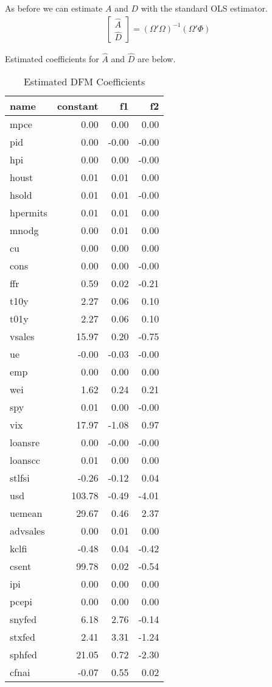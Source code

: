\documentclass[11pt, letterpaper]{article}\usepackage[]{graphicx}\usepackage[]{color}
\begin{document}
As before we can estimate $A$ and $D$ with the standard OLS estimator.
\begin{align*}
\begin{bmatrix}
	\widehat{A}\\
	\widehat{D}
\end{bmatrix} =
(\Omega' \Omega)^{-1} (\Omega'\Phi)
\end{align*}

Estimated coefficients for $\widehat{A}$ and $\widehat{D}$ are below.
\begin{table}[H]
\centering
\begingroup\footnotesize
\begin{tabular}{lrrr}
  \hline
name & constant & f1 & f2 \\ 
  \hline
mpce & 0.00 & 0.00 & 0.00 \\ 
  pid & 0.00 & -0.00 & -0.00 \\ 
  hpi & 0.00 & 0.00 & -0.00 \\ 
  houst & 0.01 & 0.01 & 0.00 \\ 
  hsold & 0.01 & 0.01 & -0.00 \\ 
  hpermits & 0.01 & 0.01 & 0.00 \\ 
  mnodg & 0.00 & 0.01 & 0.00 \\ 
  cu & 0.00 & 0.00 & 0.00 \\ 
  cons & 0.00 & 0.00 & -0.00 \\ 
  ffr & 0.59 & 0.02 & -0.21 \\ 
  t10y & 2.27 & 0.06 & 0.10 \\ 
  t01y & 2.27 & 0.06 & 0.10 \\ 
  vsales & 15.97 & 0.20 & -0.75 \\ 
  ue & -0.00 & -0.03 & -0.00 \\ 
  emp & 0.00 & 0.00 & 0.00 \\ 
  wei & 1.62 & 0.24 & 0.21 \\ 
  spy & 0.01 & 0.00 & -0.00 \\ 
  vix & 17.97 & -1.08 & 0.97 \\ 
  loansre & 0.00 & -0.00 & -0.00 \\ 
  loanscc & 0.01 & 0.00 & 0.00 \\ 
  stlfsi & -0.26 & -0.12 & 0.04 \\ 
  usd & 103.78 & -0.49 & -4.01 \\ 
  uemean & 29.67 & 0.46 & 2.37 \\ 
  advsales & 0.00 & 0.01 & 0.00 \\ 
  kclfi & -0.48 & 0.04 & -0.42 \\ 
  csent & 99.78 & 0.02 & -0.54 \\ 
  ipi & 0.00 & 0.00 & 0.00 \\ 
  pcepi & 0.00 & 0.00 & 0.00 \\ 
  snyfed & 6.18 & 2.76 & -0.14 \\ 
  stxfed & 2.41 & 3.31 & -1.24 \\ 
  sphfed & 21.05 & 0.72 & -2.30 \\ 
  cfnai & -0.07 & 0.55 & 0.02 \\ 
   \hline
\end{tabular}
\endgroup
\caption{Estimated DFM Coefficients} 
\end{table}
\end{document}
